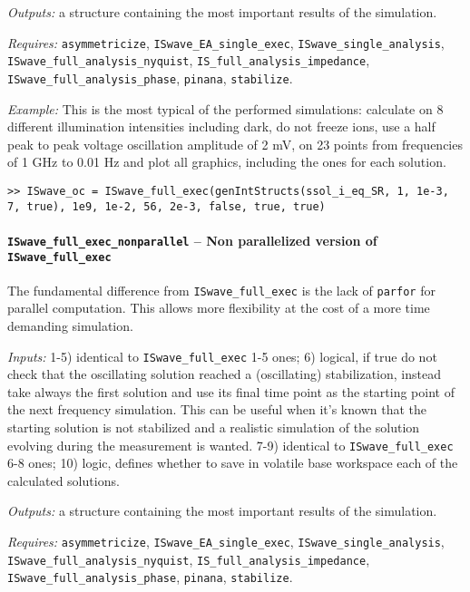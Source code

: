 	\textit{Outputs:} a structure containing the most important results of the simulation.

	\textit{Requires:} \texttt{asymmetricize}, \texttt{ISwave\_EA\_single\_exec},
	\texttt{ISwave\_single\_analysis}, \texttt{ISwave\_full\_analysis\_nyquist},
	\texttt{IS\_full\_analysis\_impedance}, \texttt{ISwave\_full\_analysis\_phase}, \texttt{pinana},
	\texttt{stabilize}.


	\textit{Example:} This is the most typical of the performed simulations: calculate on 8 different illumination intensities including dark, do not freeze ions, use a half peak to peak
	voltage oscillation amplitude of 2 mV, on 23 points from frequencies of 1 GHz to
	0.01 Hz and plot all graphics, including the ones for each solution.
	\begin{lstlisting}[style=Matlab-editor]
>> ISwave_oc = ISwave_full_exec(genIntStructs(ssol_i_eq_SR, 1, 1e-3, 7, true), 1e9, 1e-2, 56, 2e-3, false, true, true)
\end{lstlisting}

	\paragraph{\texttt{ISwave\_full\_exec\_nonparallel} -- Non parallelized version of \texttt{ISwave\_full\_exec}}
	The fundamental difference from \texttt{ISwave\_full\_exec} is the lack of \texttt{parfor}
	for parallel computation. This allows more flexibility at the cost of a
	more time demanding simulation.

	\textit{Inputs:} 1-5) identical to \texttt{ISwave\_full\_exec} 1-5 ones;
	6) logical, if true do not check that the oscillating solution reached a
	(oscillating) stabilization, instead take always the first solution
	and use its final time point as the starting point of the next
	frequency simulation. This can be useful when it's known that the
	starting solution is not stabilized and a realistic simulation of the
	solution evolving during the measurement is wanted.
	7-9) identical to \texttt{ISwave\_full\_exec} 6-8 ones;
	10) logic, defines whether to save in volatile base
	workspace each of the calculated solutions.

	\textit{Outputs:} a structure containing the most important results of the simulation.

	\textit{Requires:} \texttt{asymmetricize}, \texttt{ISwave\_EA\_single\_exec},
	\texttt{ISwave\_single\_analysis}, \texttt{ISwave\_full\_analysis\_nyquist},
	\texttt{IS\_full\_analysis\_impedance}, \texttt{ISwave\_full\_analysis\_phase}, \texttt{pinana},
	\texttt{stabilize}.

